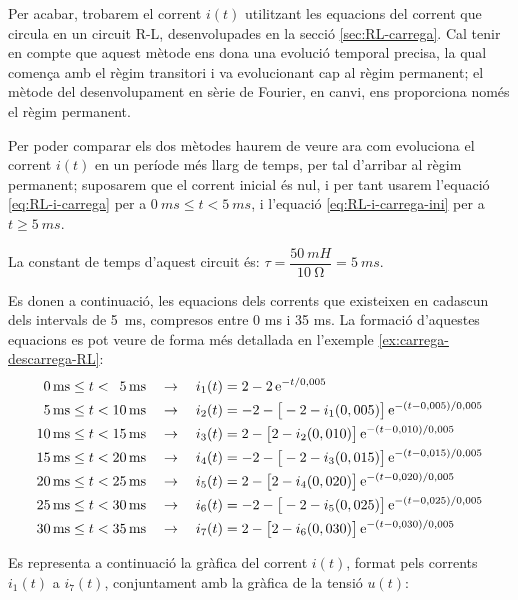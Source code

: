 \begin{exemple}
    Per acabar, trobarem el corrent $i(t)$ utilitzant les equacions del corrent que circula en un circuit R-L, desenvolupades en la secció \vref{sec:RL-carrega}. Cal tenir en compte que aquest mètode ens dona una evolució temporal precisa, la qual comença amb el règim transitori i va evolucionant cap al règim permanent; el mètode del desenvolupament en sèrie de Fourier, en canvi, ens proporciona només el règim permanent.

    Per  poder comparar els dos mètodes haurem de veure  ara com evoluciona el corrent $i(t)$ en un període més llarg de temps, per tal d'arribar al règim permanent; suposarem que el corrent inicial és nul, i per tant usarem l'equació \eqref{eq:RL-i-carrega} per a $\SI{0}{ms} \leq t < \SI{5}{ms}$, i l'equació \eqref{eq:RL-i-carrega-ini} per a $t \geq \SI{5}{ms}$.

    La constant de temps d'aquest circuit és: $\tau = \dfrac{\SI{50}{mH}}{\SI{10}{\ohm}} = \SI{5}{ms}$.


    Es donen a continuació, les equacions dels corrents que existeixen en cadascun dels intervals de \SI{5}{ms}, compresos entre 0 ms i 35 ms. La formació d'aquestes equacions es pot veure de forma més detallada en l'exemple \vref{ex:carrega-descarrega-RL}:
    \begin{align*}
      \phantom{0}\SI{0}{ms} \leq t < \phantom{0}\SI{5}{ms}  & \quad\rightarrow\quad i_1(t) = 2 - 2 \,\mathrm{e}^{-t/0,005} \\
      \phantom{0}\SI{5}{ms} \leq t < \SI{10}{ms} & \quad\rightarrow\quad i_2(t) = -2 - \big[-2 - i_1(0,005)\big]\, \mathrm{e}^{-(t-0,005)/0,005}  \\
      \SI{10}{ms}\leq t < \SI{15}{ms} & \quad\rightarrow\quad i_3(t) = 2 - \big[2 - i_2(0,010)\big]\, \mathrm{e}^{-(t-0,010)/0,005} \\
      \SI{15}{ms} \leq t < \SI{20}{ms} & \quad\rightarrow\quad i_4(t) = -2 - \big[-2 - i_3(0,015)\big]\, \mathrm{e}^{-(t-0,015)/0,005}  \\
      \SI{20}{ms}\leq t < \SI{25}{ms} & \quad\rightarrow\quad i_5(t) = 2 - \big[2 - i_4(0,020)\big]\, \mathrm{e}^{-(t-0,020)/0,005} \\
      \SI{25}{ms} \leq t < \SI{30}{ms} & \quad\rightarrow\quad i_6(t) = -2 - \big[-2 - i_5(0,025)\big]\, \mathrm{e}^{-(t-0,025)/0,005}  \\
      \SI{30}{ms}\leq t < \SI{35}{ms} & \quad\rightarrow\quad i_7(t) = 2 - \big[2 - i_6(0,030)\big]\, \mathrm{e}^{-(t-0,030)/0,005}
    \end{align*}

    Es representa a continuació la gràfica del corrent $i(t)$, format pels corrents $i_1(t)$ a $i_7(t)$, conjuntament amb la gràfica de la tensió $u(t)$:
    \begin{center}
      
    \end{center}


\end{exemple}
